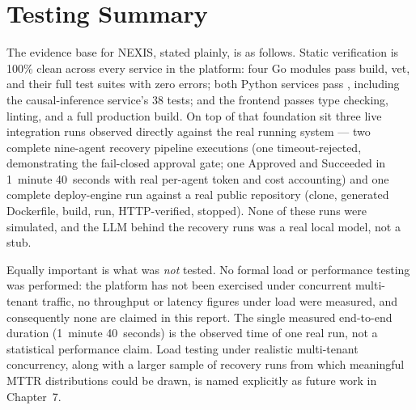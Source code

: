 \section{Testing Summary}

The evidence base for NEXIS, stated plainly, is as follows. Static
verification is 100\% clean across every service in the platform: four Go
modules pass build, vet, and their full test suites with zero errors; both
Python services pass , including the causal-inference
service's 38 tests; and the frontend passes type checking, linting, and a
full production build. On top of that foundation sit three live
integration runs observed directly against the real running system --- two
complete nine-agent recovery pipeline executions (one timeout-rejected,
demonstrating the fail-closed approval gate; one Approved and Succeeded in
1~minute 40~seconds with real per-agent token and cost accounting) and one
complete deploy-engine run against a real public repository (clone,
generated Dockerfile, build, run, HTTP-verified, stopped). None of these
runs were simulated, and the LLM behind the recovery runs was a real local
model, not a stub.

Equally important is what was \emph{not} tested. No formal load or
performance testing was performed: the platform has not been exercised
under concurrent multi-tenant traffic, no throughput or latency figures
under load were measured, and consequently none are claimed in this
report. The single measured end-to-end duration (1~minute 40~seconds) is
the observed time of one real run, not a statistical performance claim.
Load testing under realistic multi-tenant concurrency, along with a larger
sample of recovery runs from which meaningful MTTR distributions could be
drawn, is named explicitly as future work in Chapter~7.
